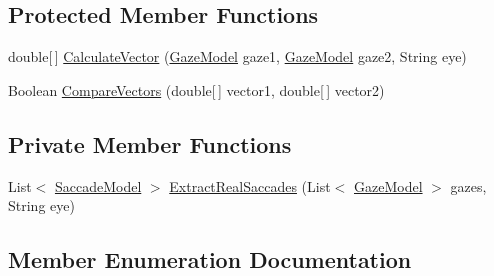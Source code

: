 \subsection*{Protected Member Functions}
\begin{DoxyCompactItemize}
\item 
double\mbox{[}$\,$\mbox{]} \hyperlink{class_web_analyzer_1_1_models_1_1_algorithm_model_1_1_algorithm_afbd5e3a6eb4bbcd142f6934ba6026b3b}{Calculate\+Vector} (\hyperlink{class_web_analyzer_1_1_models_1_1_data_model_1_1_gaze_model}{Gaze\+Model} gaze1, \hyperlink{class_web_analyzer_1_1_models_1_1_data_model_1_1_gaze_model}{Gaze\+Model} gaze2, String eye)
\item 
Boolean \hyperlink{class_web_analyzer_1_1_models_1_1_algorithm_model_1_1_algorithm_a4a2a618988f6a538ed55deee35243ee4}{Compare\+Vectors} (double\mbox{[}$\,$\mbox{]} vector1, double\mbox{[}$\,$\mbox{]} vector2)
\end{DoxyCompactItemize}
\subsection*{Private Member Functions}
\begin{DoxyCompactItemize}
\item 
List$<$ \hyperlink{class_web_analyzer_1_1_models_1_1_analysis_model_1_1_saccade_model}{Saccade\+Model} $>$ \hyperlink{class_web_analyzer_1_1_models_1_1_algorithm_model_1_1_algorithm_a3ac55aacffefb5f2459f6b43b44a595b}{Extract\+Real\+Saccades} (List$<$ \hyperlink{class_web_analyzer_1_1_models_1_1_data_model_1_1_gaze_model}{Gaze\+Model} $>$ gazes, String eye)
\end{DoxyCompactItemize}


\subsection{Member Enumeration Documentation}
\hypertarget{class_web_analyzer_1_1_models_1_1_algorithm_model_1_1_algorithm_a170e7786e033cbd0c09cabb30030794b}{}

